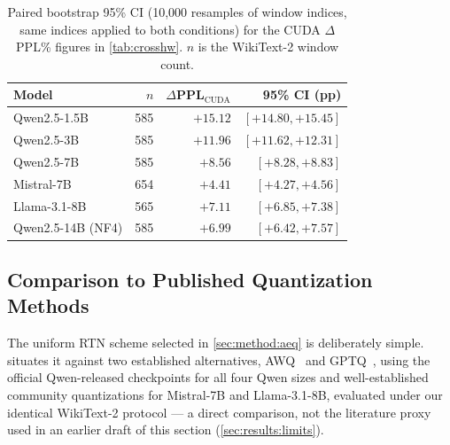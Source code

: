 \documentclass[10pt,twocolumn]{article}
\begin{document}
\begin{table}[t]
  \centering
  \caption{Paired bootstrap 95\% CI (10{,}000 resamples of window indices,
    same indices applied to both conditions) for the CUDA $\Delta$PPL\%
    figures in \cref{tab:crosshw}.  $n$ is the WikiText-2 window count.}
  \label{tab:bootstrap}
  \begin{tabular}{lrrr}
    \toprule
    Model & $n$ & $\Delta$PPL$_\text{CUDA}$ & 95\% CI (pp) \\
    \midrule
    Qwen2.5-1.5B      & 585 & $+15.12$ & $[+14.80,+15.45]$ \\
    Qwen2.5-3B        & 585 & $+11.96$ & $[+11.62,+12.31]$ \\
    Qwen2.5-7B        & 585 & $+8.56$  & $[+8.28,+8.83]$   \\
    Mistral-7B        & 654 & $+4.41$  & $[+4.27,+4.56]$   \\
    Llama-3.1-8B      & 565 & $+7.11$  & $[+6.85,+7.38]$   \\
    Qwen2.5-14B (NF4) & 585 & $+6.99$  & $[+6.42,+7.57]$   \\
    \bottomrule
  \end{tabular}
\end{table}

\subsection{Comparison to Published Quantization Methods}
\label{sec:results:awqgptq}

The uniform RTN scheme selected in \cref{sec:method:aeq} is deliberately
simple.   situates it against two established alternatives,
AWQ~\citep{lin2023awq} and GPTQ~\citep{frantar2023gptq}, using the official
Qwen-released checkpoints for all four Qwen sizes and well-established
community quantizations for Mistral-7B and Llama-3.1-8B, evaluated under our
identical WikiText-2 protocol --- a direct comparison, not the literature
proxy used in an earlier draft of this section (\cref{sec:results:limits}).
\end{document}
